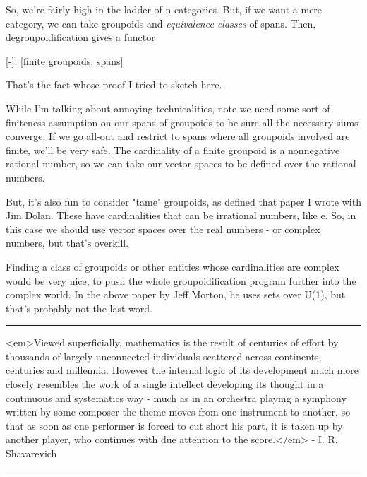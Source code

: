So, we're fairly high in the ladder of n-categories.  But, if we
want a mere category, we can take groupoids and \emph{equivalence classes}
of spans.  Then, degroupoidification gives a functor

[-]: [finite groupoids, spans] 

That's the fact whose proof I tried to sketch here.  

While I'm talking about annoying technicalities, note we need 
some sort of finiteness assumption on our spans of groupoids
to be sure all the necessary sums converge.   If we go all-out
and restrict to spans where all groupoids involved are finite,
we'll be very safe.  The cardinality of a finite groupoid is a
nonnegative rational number, so we can take our vector spaces to 
be defined over the rational numbers.

But, it's also fun to consider "tame" groupoids, as defined that 
paper I wrote with Jim Dolan.  These have cardinalities that can 
be irrational numbers, like e.   So, in this case we should use
vector spaces over the real numbers - or complex numbers, but that's
overkill.

Finding a class of groupoids or other entities whose cardinalities
are complex would be very nice, to push the whole groupoidification
program further into the complex world.  In the above paper by 
Jeff Morton, he uses sets over U(1), but that's probably not the
last word.


\par\noindent\rule{\textwidth}{0.4pt}
<em>Viewed superficially, mathematics is the result of centuries of effort by
thousands of largely unconnected individuals scattered across continents, 
centuries and millennia.  However the internal logic of its development
much more closely resembles the work of a single intellect developing its
thought in a continuous and systematics way - much as in an orchestra playing
a symphony written by some composer the theme moves from one instrument 
to another, so that as soon as one performer is forced to cut short his part,
it is taken up by another player, who continues with due attention to the
score.</em> - I. R. Shavarevich

\par\noindent\rule{\textwidth}{0.4pt}

